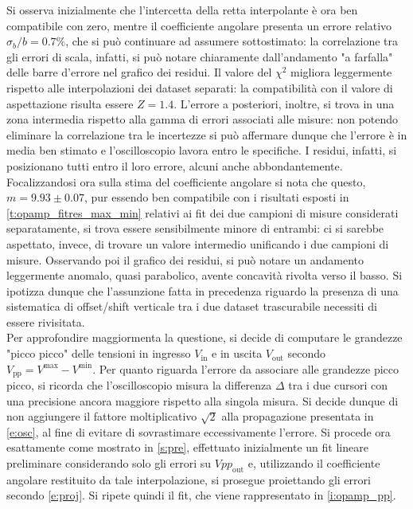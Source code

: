 \documentclass[a4paper,11pt]{article} %
\begin{document}
\noindent Si osserva inizialmente che l'intercetta della retta interpolante è ora ben compatibile con zero, mentre il
coefficiente angolare presenta un errore relativo $\sigma_{b}/b=0.7\%$, che si può continuare ad assumere sottostimato:
la correlazione tra gli errori di scala, infatti, si può notare chiaramente dall'andamento "a farfalla" delle barre
d'errore nel grafico dei residui. Il valore del $\chi^2$ migliora leggermente rispetto alle interpolazioni dei dataset
separati: la compatibilità con il valore di aspettazione risulta essere $Z=1.4$. L'errore a posteriori, inoltre, si
trova in una zona intermedia rispetto alla gamma di errori associati alle misure: non potendo eliminare la correlazione
tra le incertezze si può affermare dunque che l'errore è in media ben stimato e l'oscilloscopio lavora entro le
specifiche. I residui, infatti, si posizionano tutti entro il loro errore, alcuni anche abbondantemente. Focalizzandosi
ora sulla stima del coefficiente angolare si nota che questo, $m=9.93\pm 0.07$, pur essendo ben compatibile con i
risultati esposti in  \autoref{t:opamp_fitres_max_min} relativi ai fit dei due campioni di misure considerati
separatamente, si trova essere sensibilmente minore di entrambi: ci si sarebbe aspettato, invece, di trovare un valore
intermedio unificando i due campioni di misure. Osservando poi il grafico dei residui, si può notare un andamento
leggermente anomalo, quasi parabolico, avente concavità rivolta verso il basso. Si ipotizza dunque che l'assunzione
fatta in precedenza riguardo la presenza di una sistematica di offset/shift verticale tra i due dataset trascurabile
necessiti di essere rivisitata. \\
Per approfondire maggiormenta la questione, si decide di computare le grandezze "picco picco" delle tensioni in ingresso
$V_{\text{in}}$ e in uscita $V_{\text{out}}$ secondo $V_{\text{pp}}=V^{\text{max}}-V^{\text{min}}$. Per quanto riguarda
l'errore da associare alle grandezze picco picco, si ricorda che l'oscilloscopio misura la differenza $\Delta$ tra i due
cursori con una precisione ancora maggiore rispetto alla singola misura. Si decide dunque di non aggiungere il fattore
moltiplicativo $\sqrt{2}$ alla propagazione presentata in  \autoref{e:osc}, al fine di evitare di sovrastimare
eccessivamente l'errore. Si procede ora esattamente come mostrato in  \autoref{s:pre}, effettuato inizialmente un fit
lineare preliminare considerando solo gli errori su $Vpp_{\text{out}}$ e, utilizzando il coefficiente angolare
restituito da tale interpolazione, si prosegue proiettando gli errori secondo  \autoref{e:proj}. Si ripete quindi il
fit, che viene rappresentato in \autoref{i:opamp_pp}.
\end{document}
